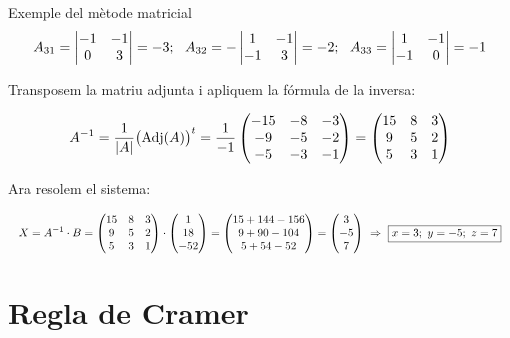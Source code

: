 \documentclass[11pt,a4paper]{article}
\newcommand{\fmdisp}[1]{\[\setbox2=\hbox{$\displaystyle #1$}\ifdim\wd2>\linewidth\resizebox{\linewidth}{!}{\box2}\else\box2\fi\]}
\begin{document}
\begin{fmex}{Exemple del mètode matricial}
\fmdisp{A_{31}=\begin{vmatrix}-1 & -1\\ 0 & 3\end{vmatrix}=-3;\ \ A_{32}=-\begin{vmatrix}1 & -1\\ -1 & 3\end{vmatrix}=-2;\ \ A_{33}=\begin{vmatrix}1 & -1\\ -1 & 0\end{vmatrix}=-1}

Transposem la matriu adjunta i apliquem la fórmula de la inversa:

\fmdisp{A^{-1}=\frac{1}{|A|}\big(\mathrm{Adj}(A)\big)^t=\frac{1}{-1}\begin{pmatrix}-15 & -8 & -3\\ -9 & -5 & -2\\ -5 & -3 & -1\end{pmatrix}=\begin{pmatrix}15 & 8 & 3\\ 9 & 5 & 2\\ 5 & 3 & 1\end{pmatrix}}

Ara resolem el sistema:

\fmdisp{X=A^{-1}\cdot B=\begin{pmatrix}15 & 8 & 3\\ 9 & 5 & 2\\ 5 & 3 & 1\end{pmatrix}\cdot\begin{pmatrix}1\\ 18\\ -52\end{pmatrix}=\begin{pmatrix}15+144-156\\ 9+90-104\\ 5+54-52\end{pmatrix}=\begin{pmatrix}3\\ -5\\ 7\end{pmatrix}\ \Rightarrow\ \boxed{x=3;\ y=-5;\ z=7}}

\end{fmex}

\section{Regla de Cramer}\hypertarget{sec3}{}
\end{document}
